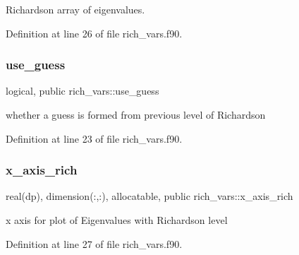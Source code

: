 Richardson array of eigenvalues. 



Definition at line 26 of file rich\+\_\+vars.\+f90.

\mbox{\label{namespacerich__vars_aedc7171560db899c515d1610d99582c9}} 
\subsubsection{\texorpdfstring{use\+\_\+guess}{use\_guess}}
{\footnotesize\ttfamily logical, public rich\+\_\+vars\+::use\+\_\+guess}



whether a guess is formed from previous level of Richardson 



Definition at line 23 of file rich\+\_\+vars.\+f90.

\mbox{\label{namespacerich__vars_a7f584d9b84f3e3e230b45ce4b8e0e9b1}} 
\subsubsection{\texorpdfstring{x\+\_\+axis\+\_\+rich}{x\_axis\_rich}}
{\footnotesize\ttfamily real(dp), dimension(\+:,\+:), allocatable, public rich\+\_\+vars\+::x\+\_\+axis\+\_\+rich}



x axis for plot of Eigenvalues with Richardson level 



Definition at line 27 of file rich\+\_\+vars.\+f90.

